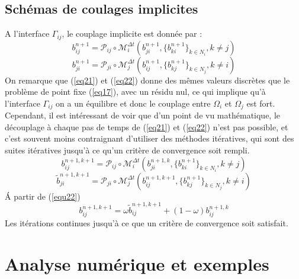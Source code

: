 \documentclass[11pt,a4paper]{scrartcl}%
\begin{document}
	\subsection{Schémas de coulages implicites}
	A l'interface $\Gamma_{ij}$, le couplage implicite est donnée par :
	\begin{equation}\label{eq21}
	b_{ij}^{n+1} = \mathcal{P}_{ij}\circ\mathcal{M}_i^{\Delta t}(b_{ji}^{n+1},\{b_{ki}^{n+1}\}_{k\in N_i}, k\neq j)
	\end{equation}
	\begin{equation}\label{eq22}
	b_{ji}^{n+1} = \mathcal{P}_{ji}\circ\mathcal{M}_j^{\Delta t}(b_{ij}^{n+1},\{b_{kj}^{n+1}\}_{k\in N_j}, k\neq i)
	\end{equation} 
	On remarque que (\ref{eq21}) et (\ref{eq22}) donne des mêmes valeurs discrètes que le problème de point fixe  (\ref{eq17}), avec un résidu nul, ce qui implique qu'à l'interface $\Gamma_{ij}$ on a un équilibre et donc le couplage entre $\Omega_i$ et $\Omega_j$ est fort. Cependant, il est intéressant de voir que d'un point de vu mathématique, le découplage à chaque pas de temps de  (\ref{eq21}) et (\ref{eq22}) n'est pas possible, et c'est souvent moins contraignant d'utiliser des méthodes itératives, qui sont des suites itératives jusqu'à ce qu'un critère de convergence soit rempli. 
	\begin{equation}%
	b_{ij}^{n+1, k+1} = \mathcal{P}_{ij}\circ\mathcal{M}_i^{\Delta t}(b_{ji}^{n+1, k},\{b_{ki}^{n+1}\}_{k\in N_i}, k\neq j)
	\end{equation}
	\begin{equation}\label{equ22}
	\tilde{b}_{ji}^{n+1, k+1} = \mathcal{P}_{ji}\circ\mathcal{M}_j^{\Delta t}(b_{ij}^{n+1, k+1},\{b_{kj}^{n+1}\}_{k\in N_j}, k\neq i)
	\end{equation} 
 	\'A partir de (\ref{equ22})
	\begin{equation}
	b_{ij}^{n+1, k+1} = \omega \tilde{b}_{ij}^{n+1, k+1} + (1-\omega)b_{ij}^{n+1, k}
	\end{equation}
	Les itérations continues jusqu'à ce que un critère de convergence soit satisfait.
	\newpage
	\section{Analyse numérique et exemples}\label{sec4}
\end{document}
